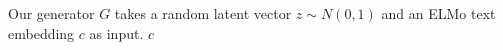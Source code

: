 Our generator $G$ takes a random latent vector $z \sim N(0, 1)$ and an ELMo text embedding $c$ as input. $c$ 